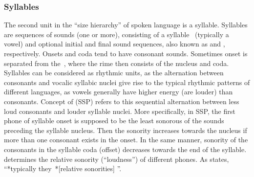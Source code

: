 \documentclass[letterpaper,10pt,english]{jupyterBook}
\begin{document}
\subsubsection{Syllables}
\label{\detokenize{Introduction/Linguistic_structure_of_speech:syllables}}
\sphinxAtStartPar
The second unit in the “size hierarchy” of spoken language is a
syllable. Syllables are sequences of sounds (one or more), consisting of
a syllable  (typically a vowel) and optional initial and final
sound sequences, also known as  and , respectively. Onsets
and coda tend to have consonant sounds. Sometimes onset is separated
from the , where the rime then consists of the nucleus and coda.
Syllables can be considered as rhythmic units, as the alternation
between consonants and vocalic syllabic nuclei give rise to the typical
rhythmic patterns of different languages, as vowels generally have
higher energy (are louder) than consonants. Concept of  (SSP) refers to this sequential alternation
between less loud consonants and louder syllable nuclei. More
specifically, in SSP, the first phone of syllable onset is supposed to
be the least sonorous of the sounds preceding the syllable nucleus. Then
the sonority increases towards the nucleus if more than one consonant
exists in the onset. In the same manner, sonority of the consonants in
the syllable coda (offset) decreases towards the end of the syllable.
 determines the relative sonority (“loudness”) of
different phones. As
states, “*typically they *{[}relative sonorities{]} ”.
\end{document}
